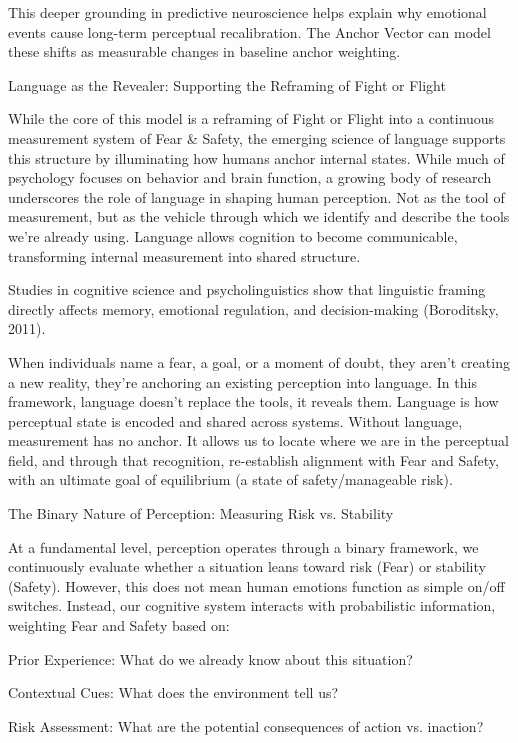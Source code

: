 \documentclass[11pt]{article}
\begin{document}
This deeper grounding in predictive neuroscience helps explain why emotional events cause long-term perceptual recalibration. The Anchor Vector can model these shifts as measurable changes in baseline anchor weighting.

Language as the Revealer: Supporting the Reframing of Fight or Flight

While the core of this model is a reframing of Fight or Flight into a continuous measurement system of Fear & Safety, the emerging science of language supports this structure by illuminating how humans anchor internal states. While much of psychology focuses on behavior and brain function, a growing body of research underscores the role of language in shaping human perception. Not as the tool of measurement, but as the vehicle through which we identify and describe the tools we’re already using. Language allows cognition to become communicable, transforming internal measurement into shared structure.

Studies in cognitive science and psycholinguistics show that linguistic framing directly affects memory, emotional regulation, and decision-making (Boroditsky, 2011).

When individuals name a fear, a goal, or a moment of doubt, they aren't creating a new reality, they’re anchoring an existing perception into language. In this framework, language doesn’t replace the tools, it reveals them. Language is how perceptual state is encoded and shared across systems. Without language, measurement has no anchor. It allows us to locate where we are in the perceptual field, and through that recognition, re-establish alignment with Fear and Safety, with an ultimate goal of equilibrium (a state of safety/manageable risk).

The Binary Nature of Perception: Measuring Risk vs. Stability

At a fundamental level, perception operates through a binary framework, we continuously evaluate whether a situation leans toward risk (Fear) or stability (Safety). However, this does not mean human emotions function as simple on/off switches. Instead, our cognitive system interacts with probabilistic information, weighting Fear and Safety based on:

Prior Experience: What do we already know about this situation?

Contextual Cues: What does the environment tell us?

Risk Assessment: What are the potential consequences of action vs. inaction?
\end{document}

